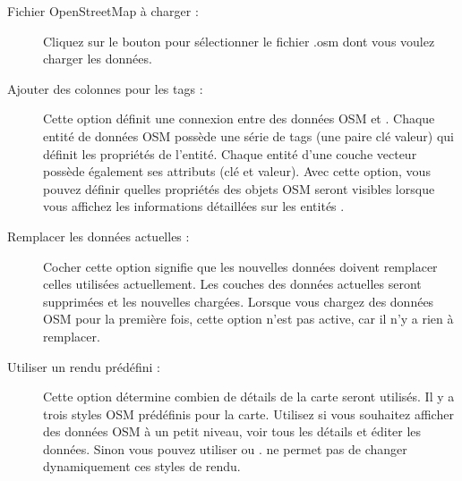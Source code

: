 \begin{description}
\item[Fichier OpenStreetMap à charger :] Cliquez sur le bouton pour sélectionner le fichier .osm dont vous voulez charger les données.
\item[Ajouter des colonnes pour les tags :] Cette option définit une connexion entre des données OSM et \qg. Chaque entité de données OSM possède une série de tags (une paire clé valeur) qui définit les propriétés de l'entité. Chaque entité d'une couche vecteur \qg possède également ses attributs (clé et valeur). Avec cette option, vous pouvez définir quelles propriétés des objets OSM seront visibles lorsque vous affichez les informations détaillées sur les entités \qg.
\item[Remplacer les données actuelles :] Cocher cette option signifie que les nouvelles données doivent remplacer celles utilisées actuellement. Les couches des données actuelles seront supprimées et les nouvelles chargées. Lorsque vous chargez des données OSM pour la première fois, cette option n'est pas active, car il n'y a rien à remplacer.
\item[Utiliser un rendu prédéfini :] Cette option détermine combien de détails de la carte seront utilisés. Il y a trois styles OSM prédéfinis pour la carte. Utilisez  si vous souhaitez afficher des données OSM à un petit niveau, voir tous les détails et éditer les données. Sinon vous pouvez utiliser  ou . \qg \CURRENT ne permet pas de changer dynamiquement ces styles de rendu.
\end{description}

